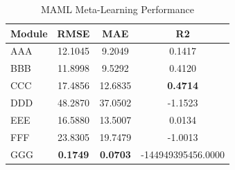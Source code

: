 \begin{table}[htbp]
\centering
\caption{MAML Meta-Learning Performance}
\label{tab:maml}
\begin{tabular}{lccc}
\hline
Module & RMSE & MAE & R2 \\
\hline
AAA & 12.1045 & 9.2049 & 0.1417 \\
BBB & 11.8998 & 9.5292 & 0.4120 \\
CCC & 17.4856 & 12.6835 & \textbf{0.4714} \\
DDD & 48.2870 & 37.0502 & -1.1523 \\
EEE & 16.5880 & 13.5007 & 0.0134 \\
FFF & 23.8305 & 19.7479 & -1.0013 \\
GGG & \textbf{0.1749} & \textbf{0.0703} & -144949395456.0000 \\
\hline
\end{tabular}
\end{table}

